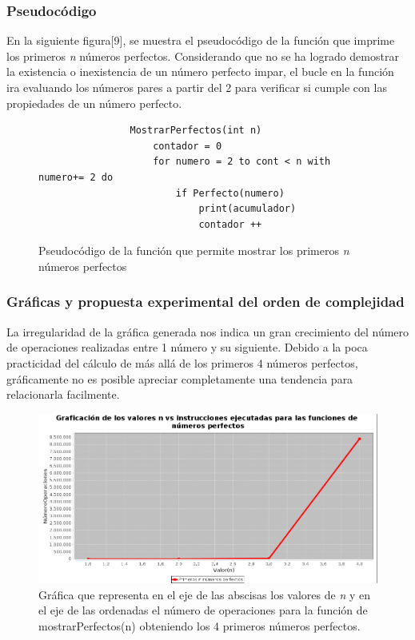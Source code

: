 \documentclass{report}
\begin{document}
        \subsubsection*{Pseudocódigo}
        En la siguiente figura[9], se muestra el pseudocódigo de la función que imprime los primeros \textit{n} números perfectos. Considerando que no se ha logrado demostrar la existencia o inexistencia de un número perfecto impar, el bucle en la función ira evaluando los números pares a partir del 2 para verificar si cumple con las propiedades de un número perfecto.
        \begin{figure}[!h]
            \begin{verbatim}
                MostrarPerfectos(int n)
                    contador = 0
                    for numero = 2 to cont < n with numero+= 2 do
                        if Perfecto(numero)
                            print(acumulador)
                            contador ++
            \end{verbatim}
            \caption{Pseudocódigo de la función que permite mostrar los primeros \textit{n} números perfectos}
            \label{fig:my_label}
        \end{figure}
            
        \subsubsection*{Gráficas y propuesta experimental del orden de complejidad}
            La irregularidad de la gráfica generada nos indica un gran crecimiento del número de operaciones realizadas entre 1 número y su siguiente. Debido a la poca practicidad del cálculo de más allá de los primeros 4 números perfectos, gráficamente no es posible apreciar completamente una tendencia para relacionarla facilmente.
            \begin{figure}[!h]
                \centering
        	    \includegraphics[width=14cm]{Imagenes/mostrarPerfectos1.png}
                \caption{Gráfica que representa en el eje de las abscisas los valores de \textit{n} y en el eje de las ordenadas el número de operaciones para la función de mostrarPerfectos(n) obteniendo los 4 primeros números perfectos.}
                \label{fig:my_label}
            \end{figure}
            
\end{document}
